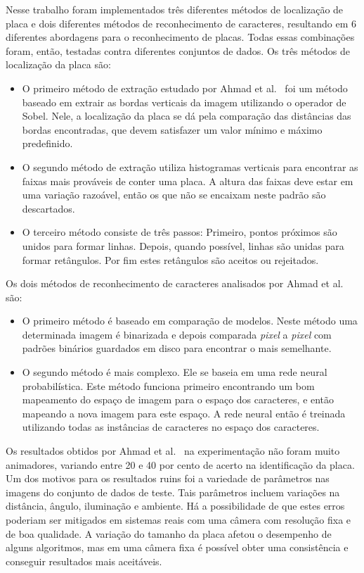 Nesse trabalho foram implementados três diferentes métodos de localização de
placa e dois diferentes métodos de reconhecimento de caracteres, resultando em 6 diferentes abordagens para o reconhecimento de placas. Todas essas combinações foram, então, testadas contra diferentes conjuntos de dados. Os três métodos de localização da placa são:

\begin{itemize}
\item O primeiro método de extração estudado por Ahmad et al.~\cite{ahmad2015automatic} foi um método baseado em extrair as bordas verticais da imagem utilizando o operador de Sobel. Nele, a localização da placa se dá pela comparação das distâncias das bordas encontradas, que devem satisfazer um valor mínimo e máximo predefinido. 
\item O segundo método de extração utiliza histogramas verticais para encontrar as faixas mais prováveis de conter uma placa. A altura das faixas deve estar em uma variação razoável, então os que não se encaixam neste padrão são descartados. 
\item O terceiro método consiste de três passos: Primeiro, pontos próximos são unidos para formar linhas. Depois, quando possível, linhas são unidas para formar retângulos. Por fim estes retângulos são aceitos ou rejeitados.
\end{itemize}

Os dois métodos de reconhecimento de caracteres analisados por Ahmad et al.~\cite{ahmad2015automatic} são:

\begin{itemize}
\item O primeiro método é baseado em comparação de modelos. Neste método uma determinada imagem é binarizada e depois comparada \emph{pixel} a \emph{pixel} com padrões binários guardados em disco para encontrar o mais semelhante. 
\item O segundo método é mais complexo. Ele se baseia em uma rede neural probabilística. Este método funciona primeiro encontrando um bom mapeamento do espaço de imagem para o espaço dos caracteres, e então mapeando a nova imagem para este espaço. A rede neural então é treinada utilizando todas as instâncias de caracteres no espaço dos caracteres.
\end{itemize}

Os resultados obtidos por Ahmad et al.~\cite{ahmad2015automatic} na experimentação não foram muito animadores, variando entre 20 e 40 por cento de acerto na identificação da placa.
Um dos motivos para os resultados ruins foi a variedade de parâmetros nas imagens do conjunto de dados de teste. Tais parâmetros incluem
variações na distância, ângulo, iluminação e ambiente. Há a possibilidade de que estes erros poderiam ser mitigados em sistemas reais com uma câmera com resolução fixa e de boa qualidade. A variação do tamanho da placa afetou o desempenho de alguns algoritmos, mas em uma câmera fixa é possível obter uma consistência e conseguir resultados mais aceitáveis.

